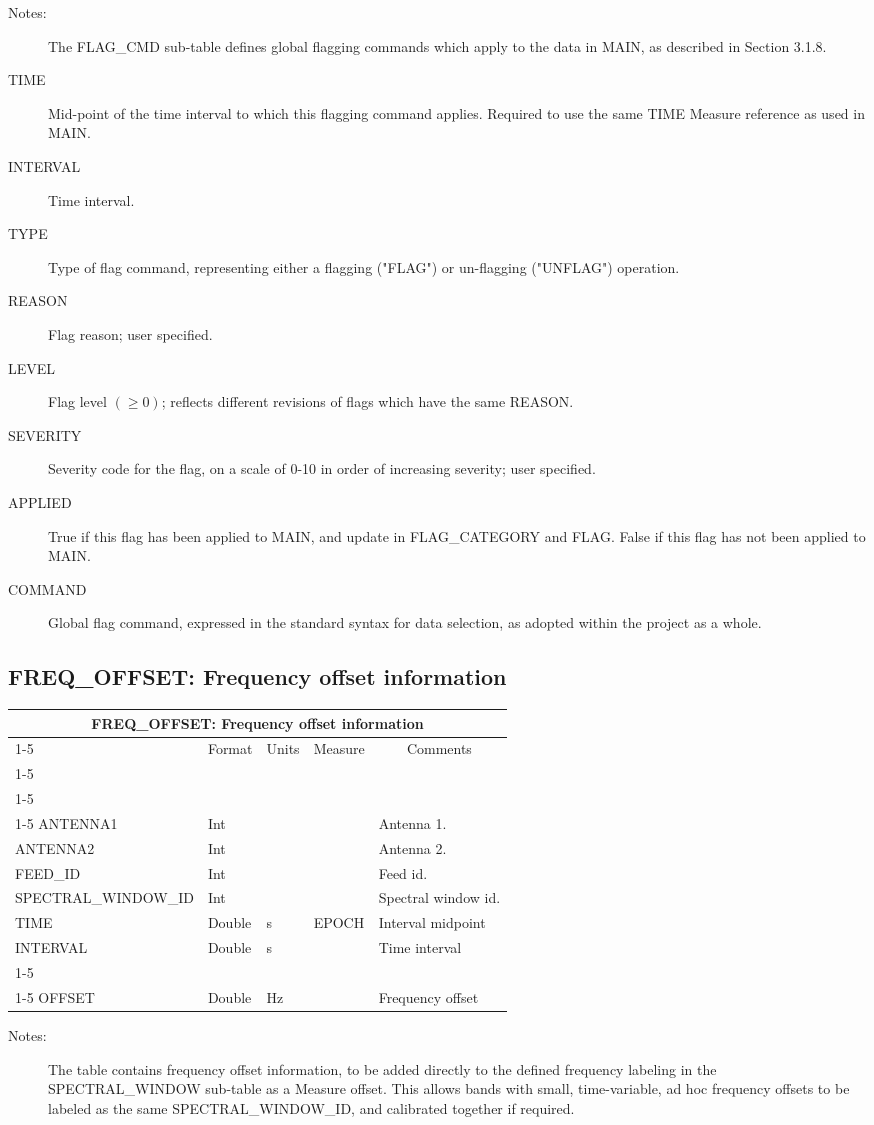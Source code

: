 \documentclass{article}
\newcommand{\defline}[1]{\cline{1-5}
\multicolumn{5}{|l|}{#1} \\
\cline{1-5}}
\newcommand{\definetable}[2]
{
	\vfill\newpage
	\subsection{#1}
        \vspace{0.15in}
        \small
	\begin{tabular}{|l|p{1.25in}|l|p{.9in}|p{1.4in}|}
	\hline
	\multicolumn{5}{|c|}{\bf #1}\\ 
	\cline{1-5}
        \multicolumn{1}{|c|}{Name}&\multicolumn{1}{|c|}{Format}&
        \multicolumn{1}{|c|}{Units}&\multicolumn{1}{|c|}{Measure}&
        \multicolumn{1}{|c|}{Comments}\\
        \cline{1-5}
        #2
        \hline
	\end{tabular}
}
\begin{document}
\begin{itemize}
\begin{description}
\item[Notes:] The FLAG\_CMD sub-table defines global flagging commands
which apply to the data in MAIN, as described in Section 3.1.8.

\item[TIME] Mid-point of the time interval to which this flagging
command applies. Required to use the same TIME Measure reference as
used in MAIN.

\item[INTERVAL] Time interval.

\item[TYPE] Type of flag command, representing either a flagging
("FLAG") or un-flagging ("UNFLAG") operation.

\item[REASON] Flag reason; user specified.

\item[LEVEL] Flag level $(\geq 0)$; reflects different revisions of
flags which have the same REASON.

\item[SEVERITY] Severity code for the flag, on a scale of 0-10 in
order of increasing severity; user specified.

\item[APPLIED] True if this flag has been applied to MAIN, and update
in FLAG\_CATEGORY and FLAG. False if this flag has not been applied to
MAIN.

\item[COMMAND] Global flag command, expressed in the standard
syntax for data selection, as adopted within the project as a whole.

\end{description}

\definetable{FREQ\_OFFSET: Frequency offset information}{
\defline{\bf Columns}
\defline{\em Key}
ANTENNA1  &   Int  & & & Antenna 1.\\
ANTENNA2  &   Int  & & & Antenna 2.\\
FEED\_ID     &   Int  & & & Feed id.\\
SPECTRAL\_WINDOW\_ID & Int & & & Spectral window id.\\
TIME & Double & s & EPOCH & Interval midpoint\\
INTERVAL & Double & s & & Time interval\\
\defline{\em Data}
OFFSET   &  Double & Hz &  & Frequency offset\\
}
\begin{description}

\item[Notes:] The table contains frequency offset information, to be
added directly to the defined frequency labeling in the
SPECTRAL\_WINDOW sub-table as a Measure offset. This allows bands with
small, time-variable, ad hoc frequency offsets to be labeled as the same
SPECTRAL\_WINDOW\_ID, and calibrated together if required.


\end{description}
\end{itemize}
\end{document}

